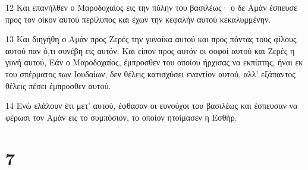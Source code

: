 \par 12 Και επανήλθεν ο Μαροδοχαίος εις την πύλην του βασιλέως· ο δε Αμάν έσπευσε προς τον οίκον αυτού περίλυπος και έχων την κεφαλήν αυτού κεκαλυμμένην.
\par 13 Και διηγήθη ο Αμάν προς Ζερές την γυναίκα αυτού και προς πάντας τους φίλους αυτού παν ό,τι συνέβη εις αυτόν. Και είπον προς αυτόν οι σοφοί αυτού και Ζερές η γυνή αυτού, Εάν ο Μαροδοχαίος, έμπροσθεν του οποίου ήρχισας να εκπίπτης, ήναι εκ του σπέρματος των Ιουδαίων, δεν θέλεις κατισχύσει εναντίον αυτού, αλλ' εξάπαντος θέλεις πέσει έμπροσθεν αυτού.
\par 14 Ενώ ελάλουν έτι μετ' αυτού, έφθασαν οι ευνούχοι του βασιλέως και έσπευσαν να φέρωσι τον Αμάν εις το συμπόσιον, το οποίον ητοίμασεν η Εσθήρ.

\chapter{7}

